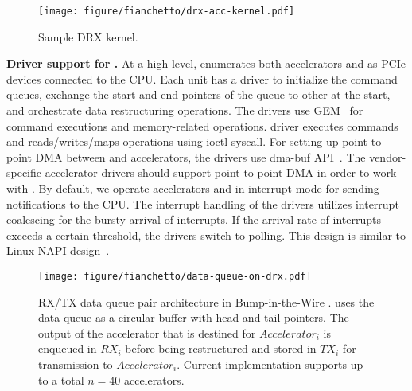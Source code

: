 \begin{figure}[t]
    \centering
    \texttt{[image: figure/fianchetto/drx-acc-kernel.pdf]}
    \caption{Sample DRX kernel.}
    \label{fig:drx-acc-kernel}
\end{figure}

\noindent \textbf{Driver support for \dmx.} 
At a high level, \dmx enumerates both accelerators and \drxs as PCIe devices connected to the CPU.  
%
%
Each \drx unit has a driver to initialize the command queues, exchange the start and end pointers of the queue to other \drxs at the start, and orchestrate data restructuring operations. 
%
The drivers use GEM~\cite{linux-drm-gem,linux-gem-lwn} for command executions and memory-related operations. \drx driver executes commands and reads/writes/maps operations using ioctl syscall. 
%
For setting up point-to-point DMA between \drx and accelerators, the drivers use dma-buf API~\cite{dma_buf:kernel:2022}.
%
The vendor-specific accelerator drivers should support point-to-point DMA in order to work with \dmx.
By default, we operate accelerators and \drxs in interrupt mode for sending notifications to the CPU. The interrupt handling of the drivers utilizes interrupt coalescing for the bursty arrival of interrupts. 
%
If the arrival rate of interrupts exceeds a certain threshold, the drivers switch to polling. This design is similar to Linux NAPI design~\cite{napi:kernel:2022}.

\begin{figure}[t!]
    \centering
    \texttt{[image: figure/fianchetto/data-queue-on-drx.pdf]}
    \caption[RX/TX data queue pair architecture in Bump-in-the-Wire \drx.]{ 
    RX/TX data queue pair architecture in Bump-in-the-Wire \drx. \drx uses the data queue as a circular buffer with head and tail pointers. The output of the accelerator that is destined for ${Accelerator}_{i}$ is enqueued in \textit{$RX_{i}$} before being restructured and stored in \textit{$TX_{i}$} for transmission to ${Accelerator}_{i}$. Current \drx implementation supports up to a total $n=40$ accelerators.
    }
    \label{fig:system:data-queue}
\end{figure}

